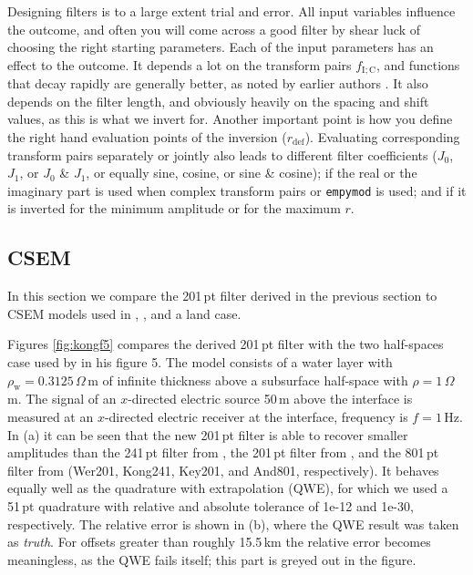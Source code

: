 \documentclass[paper,twocolumn,twoside]{geophysics}
\newcommand{\mr}[1]{\mathrm{#1}}
\begin{document}
Designing filters is to a large extent trial and error. All input variables
influence the outcome, and often you will come across a good filter by shear
luck of choosing the right starting parameters. Each of the input parameters
has an effect to the outcome. It depends a lot on the transform pairs
$f_\mr{I;C}$, and functions that decay rapidly are generally better, as noted
by earlier authors \citep[e.g.][]{USGS.75.Anderson}. It also depends on the
filter length, and obviously heavily on the spacing and shift values, as this
is what we invert for. Another important point is how you define the right hand
evaluation points of the inversion ($r_\mr{def}$). Evaluating corresponding
transform pairs separately or jointly also leads to different filter
coefficients ($J_0$, $J_1$, or $J_0$ \& $J_1$, or equally sine, cosine, or sine
\& cosine); if the real or the imaginary part is used when complex transform
pairs or \texttt{empymod} is used; and if it is inverted for the minimum
amplitude or for the maximum $r$.

\subsection{CSEM}
In this section we compare the 201\,pt filter derived in the previous section
to CSEM models used in \cite{GP.07.Kong}, \cite{GEO.12.Key}, and a land case.

Figures \ref{fig:kongf5} compares the derived 201\,pt filter with the two
half-spaces case used by \cite{GP.07.Kong} in his figure 5. The model consists
of a water layer with $\rho_\mr{w} = 0.3125\,\Omega\,$m of infinite thickness
above a subsurface half-space with $\rho = 1\,\Omega\,$m. The signal of an
$x$-directed electric source 50\,m above the interface is measured at an
$x$-directed electric receiver at the interface, frequency is $f=1\,$Hz.
%
%
In (a) it can be seen that the new 201\,pt filter is able to recover smaller
amplitudes than the 241\,pt filter from \cite{GP.07.Kong}, the 201\,pt filter
from \cite{GEO.12.Key}, and the 801\,pt filter from \cite{TMS.82.Anderson}
(Wer201, Kong241, Key201, and And801, respectively). It behaves equally well as
the quadrature with extrapolation (QWE), for which we used a 51\,pt quadrature
with relative and absolute tolerance of 1e-12 and 1e-30, respectively. The
relative error is shown in (b), where the QWE result was taken as \emph{truth}.
For offsets greater than roughly 15.5\,km the relative error becomes
meaningless, as the QWE fails itself; this part is greyed out in the figure.
\end{document}
